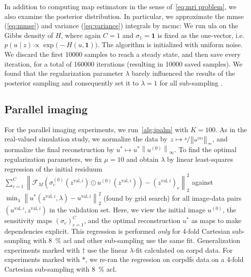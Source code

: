 \documentclass[twocolumn]{article}
\newcommand{\optimal}[1]{#1^{*}}
\newcommand{\norm}[1]{\left\lVert#1\right\rVert}
\begin{document}
In addition to computing \gls{map} estimators in the sense of~\cref{eq:mri problem}, we also examine the posterior distribution.
In particular, we approximate the \gls{mmse} (\cref{eq:mmse}) and variance (\cref{eq:variance}) integrals by \gls{mcmc}:
We run \gls{ula} on the Gibbs density of \( H \), where again \( C = 1 \) and \( \sigma_1 = \mathbf{1} \) is fixed as the one-vector, i.e.\ \( p(u \mid z) \propto \exp\big( -H(u, \mathbf{1}) \big) \).
The algorithm is initialized with uniform noise.
We discard the first \num{10000} samples to reach a steady state, and then save every  iteration, for a total of \num{160000} iterations (resulting in \num{10000} saved samples).
We found that the regularization parameter \( \lambda \) barely influenced the results of the posterior sampling and consequently set it to \( \lambda = 1 \) for all sub-sampling .
\subsection{Parallel imaging}\label{ssec:methods pi}
For the parallel imaging experiments, we run~\cref{alg:ipalm} with \( K = 100 \).
As in the real-valued simulation study, we normalize the data by \( z \mapsto \sfrac{z}{\norm{u^{(0)}}_\infty} \), and normalize the final reconstruction by \( u^{*} \mapsto u^{*}\norm{u^{(0)}}_\infty \).
To find the optimal regularization parameters, we fix \( \mu = 10 \) and obtain \( \lambda \) by linear least-squares regression of the initial residuum \( \sum_{c=1}^C \norm{\mathcal{F}_M(\sigma_{c}^{(0)}(z^{\text{val},i}) \odot u^{(0)}(z^{\text{val},i})) - {(z^{\text{val},i})}_{c}}_2^2 \) against \( \min_{\lambda} \norm{\optimal{u}(z^{\text{val},i}, \lambda) - u^{\text{val},i}}_2^2 \) (found by grid search) for all image-data pairs \( (u^{\text{val},i}, z^{\text{val},i}) \) in the validation set.
Here, we view the initial image \( u^{(0)} \), the sensitivity maps \( {(\sigma_c)}_{c=1}^C \), and the optimal reconstruction \( u^* \) as maps to make dependencies explicit.
This regression is performed \emph{only} for \num{4}-fold Cartesian sub-sampling with \qty{8}{\percent} \gls{acl} and other sub-sampling  use the same fit.
Generalization experiments marked with \( \dagger \) use the linear \( \lambda \)-fit calculated on \gls{corpd} data.
For experiments marked with \( * \), we re-ran the regression on \gls{corpdfs} data on a \num{4}-fold Cartesian sub-sampling with \qty{8}{\percent} \gls{acl}.
\end{document}

